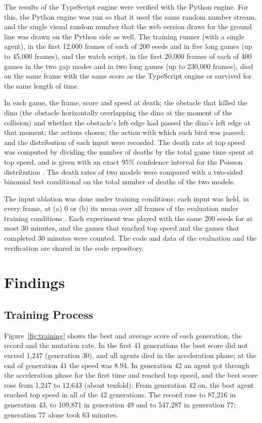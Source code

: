 \documentclass[11pt,a4paper]{article}
\begin{document}
The results of the TypeScript engine were verified with the Python engine. For this, the Python engine was run so that it used the same random number stream, and the single visual random number that the web version draws for the ground line was drawn on the Python side as well. The training runner (with a single agent), in the first 12,000 frames of each of 200 seeds and in five long games (up to 45,000 frames), and the watch script, in the first 20,000 frames of each of 400 games in the two gap modes and in two long games (up to 230,000 frames), died on the same frame with the same score as the TypeScript engine or survived for the same length of time.

In each game, the frame, score and speed at death; the obstacle that killed the dino (the obstacle horizontally overlapping the dino at the moment of the collision) and whether the obstacle's left edge had passed the dino's left edge at that moment; the actions chosen; the action with which each bird was passed; and the distribution of each input were recorded. The death rate at top speed was computed by dividing the number of deaths by the total game time spent at top speed, and is given with an exact 95\% confidence interval for the Poisson distribution \cite{garwood1936}. The death rates of two models were compared with a two-sided binomial test conditional on the total number of deaths of the two models.

The input ablation was done under training conditions: each input was held, in every frame, at (a) 0 or (b) its mean over all frames of the evaluation under training conditions \cite{covert2021}. Each experiment was played with the same 200 seeds for at most 30 minutes, and the games that reached top speed and the games that completed 30 minutes were counted. The code and data of the evaluation and the verification are shared in the code repository.

\section{Findings}

\subsection{Training Process}

Figure~\ref{fig:training} shows the best and average score of each generation, the record and the mutation rate. In the first 41 generations the best score did not exceed 1,247 (generation 30), and all agents died in the acceleration phase; at the end of generation 41 the speed was 8.94. In generation 42 an agent got through the acceleration phase for the first time and reached top speed, and the best score rose from 1,247 to 12,643 (about tenfold). From generation 42 on, the best agent reached top speed in all of the 42 generations. The record rose to 87,216 in generation 43, to 109,871 in generation 49 and to 547,287 in generation 77; generation 77 alone took 63 minutes.
\end{document}
